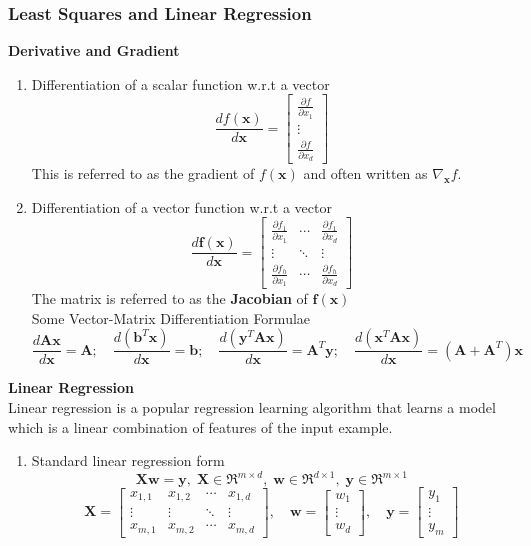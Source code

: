 \documentclass{article}
\begin{document}
\subsubsection{Least Squares and Linear Regression}
\textbf{Derivative and Gradient}
\begin{enumerate}
    \item Differentiation of a scalar function w.r.t a vector
    \[\frac{d f(\mathbf{x})}{d \mathbf{x}} =\begin{bmatrix}\frac{\partial f}{\partial x_1} \\\vdots \\\frac{\partial f}{\partial x_d}\end{bmatrix}\]
    This is referred to as the gradient of $f(\mathbf{x})$ and often written as $\nabla_{\mathbf{x}}f$.
    \item Differentiation of a vector function w.r.t a vector
    \[\frac{d \mathbf{f}(\mathbf{x})}{d \mathbf{x}} =
    \begin{bmatrix}
    \frac{\partial f_1}{\partial x_1} & \cdots & \frac{\partial f_1}{\partial x_d} \\
    \vdots & \ddots & \vdots \\
    \frac{\partial f_h}{\partial x_1} & \cdots & \frac{\partial f_h}{\partial x_d}
    \end{bmatrix}\]
    The matrix is referred to as the \textbf{Jacobian} of $\mathbf{f(x)}$ \\
    Some Vector-Matrix Differentiation Formulae \\
    \[\frac{d\mathbf{Ax}}{d\mathbf{x}}=\mathbf{A}; \quad \frac{d(\mathbf{b}^T\mathbf{x})}{d\mathbf{x}}=\mathbf{b};\quad \frac{d(\mathbf{y}^T\mathbf{Ax})}{d\mathbf{x}}=\mathbf{A}^T\mathbf{y};\quad \frac{d(\mathbf{x}^T\mathbf{Ax})}{d\mathbf{x}}=(\mathbf{A}+\mathbf{A}^T)\mathbf{x}\]
\end{enumerate}
\textbf{Linear Regression} \\
Linear regression is a popular regression learning algorithm that learns a model which is a linear combination of features of the input example.
\begin{enumerate}
    \item Standard linear regression form
    \[\mathbf{Xw=y},\; \mathbf{X}\in\Re^{ m\times d},\;\mathbf{w}\in\Re^{d\times 1},\; \mathbf{y}\in\Re^{m\times 1}\]
    \[\mathbf{X} = \begin{bmatrix}x_{1,1} & x_{1,2} & \cdots & x_{1,d} \\\vdots & \vdots & \ddots & \vdots \\x_{m,1} & x_{m,2} &\cdots & x_{m,d}\end{bmatrix}, \quad\mathbf{w} = \begin{bmatrix}w_{1} \\\vdots \\w_{d}\end{bmatrix}, \quad\mathbf{y} = \begin{bmatrix}y_{1} \\\vdots \\y_{m}\end{bmatrix}\]
    

\end{enumerate}
\end{document}
